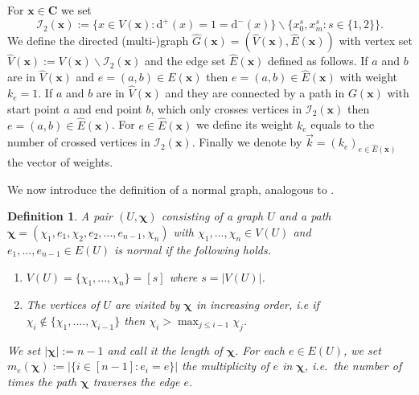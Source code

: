 \documentclass[10pt,a4paper]{amsart}
\newcommand{\patx}{\boldsymbol{x}}
\newcommand{\patchi}{\boldsymbol{\chi}}
\newtheorem{defi}{Definition}[section]
\numberwithin{equation}{section}
\begin{document}
For $\patx \in \boldsymbol C$ we set
\begin{equation*}
    \mathcal{I}_2(\patx) := \{ x \in V(\patx) \colon   \mathrm{d}^+ (x)= 1 = \mathrm{d}^-(x)\} \backslash \{x_{0}^s, x_{m}^s \colon s\in  \{1,2\}\}. 
\end{equation*}
We define the directed  (multi-)graph $\hat{G}(\patx)=(\hat{V}(\patx),\hat{E}(\patx))$ with vertex set $\hat{V}(\patx) := V(\patx) \backslash \mathcal{I}_{2}(\patx)$ and the edge set $\hat{E}(\patx)$ defined as follows. 
If $a$ and $b$ are in $\hat{V}(\patx)$ and $e=(a,b) \in E(\patx)$ then $e=(a,b) \in \hat{E}(\patx)$ with weight $k_{e}=1$. 
If $a$ and $b$ are in $\hat{V}(\patx)$ and they are connected by a path in $G(\patx)$ with start point $a$ and end point $b$, which only crosses vertices 
in $\mathcal{I}_2(\patx)$ then $e=(a,b) \in \hat{E}(\patx)$. For $e\in \hat{E}(\patx)$ we define its weight $k_{e}$ equals to the number of crossed vertices in $\mathcal{I}_2(\patx)$.
Finally we denote by $\vec{k} = (k_{e})_{e\in \hat{E}(\patx)}$ the vector of weights.

We now introduce the definition of a normal graph, analogous to \cite[Definition 5.4]{BBK_spec_radii}.
\begin{defi}\label{def:normal_graph}
A pair $(U,\patchi)$ consisting of a graph $U$ and a path $\patchi=(\chi_1,e_1,\chi_2,e_2,...,e_{n-1},\chi_n)$ with $\chi_1,...,\chi_n \in V(U)$ and $e_1,...,e_{n-1} \in E(U)$ is \textup{normal} if the following holds.
\begin{enumerate}[label=(\roman*)]
    \item $V(U) = \{\chi_1,...,\chi_n\} = [s] $ where $s = |V(U)|$.
    \item The vertices of $U$ are visited by $\patchi $ in increasing order, i.e if $\chi_{i} \notin \{\chi_1,....,\chi_{i-1}\}$ then $\chi_i > \max_{j \le i-1} \chi_j$.
\end{enumerate}
 We set  $|\patchi| := n-1$ and call it the \textup{length of $\patchi$}. 
 For each $e \in E(U)$, we set $m_{e}(\patchi) := |\{ i \in [n-1] \colon e_i=e\}|$ the \textup{multiplicity} of $e$ in $\patchi$, i.e.\ the number of times the path $\patchi$ 
 traverses the edge $e$.
\end{defi}
\end{document}
